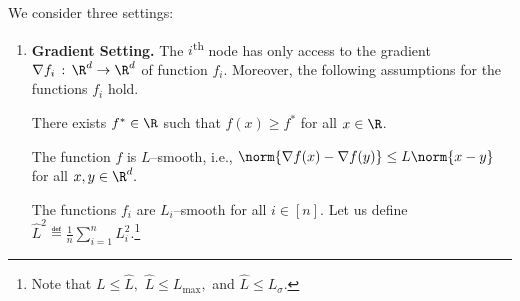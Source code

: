 \documentclass{article}
\begin{document}
We consider three settings:
\begin{enumerate}[leftmargin=0.75cm]
\item \textbf{Gradient Setting.}
The $i$\textsuperscript{th} node has only access to the gradient $\nabla f_i \,:\,\R^d \rightarrow \R^d$ of function $f_i$. Moreover, the following assumptions for the functions $f_i$ hold.
\begin{assumption}
    \label{ass:lower_bound}
    There exists $f^* \in \R$ such that $f(x) \geq f^*$ for all $x \in \R$.
\end{assumption}
\begin{assumption}
    \label{ass:lipschitz_constant}
    The function $f$ is $L$--smooth, i.e., $\norm{\nabla f(x) - \nabla f(y)} \leq L \norm{x - y}$ for all $x, y \in \R^d.$
\end{assumption}
\begin{assumption} \leavevmode
    \label{ass:nodes_lipschitz_constant}
    The functions $f_i$ are $L_i$--smooth for all $i \in [n]$. Let us define $\widehat{L}^2 \eqdef \frac{1}{n} \sum_{i=1}^{n} L_i^2.$\footnote{Note that $L \leq \widehat{L},$ $\widehat{L} \leq L_{\max},$ and $\widehat{L} \leq L_{\sigma}.$}
\end{assumption}


\end{enumerate}
\end{document}
